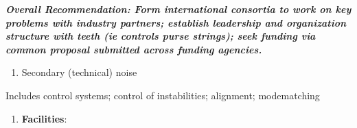 \noindent \textbf{\textit{Overall Recommendation:  Form international consortia to work on key problems with industry partners; establish leadership and organization structure with teeth (ie controls purse strings); seek funding via common proposal submitted across funding agencies.}}

\noindent \textbf{\textit{}}

\begin{enumerate}
\item \textbf{\textit{ }} Secondary (technical) noise
\end{enumerate}

\noindent Includes control systems; control of instabilities; alignment; modematching

\noindent 

\noindent 

\noindent 

\noindent 

\begin{enumerate}
\item   \textbf{Facilities}: 
\end{enumerate}
